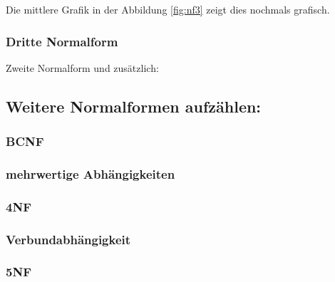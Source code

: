Die mittlere Grafik in der Abbildung \ref{fig:nf3} zeigt dies nochmals grafisch.

\subsubsection{Dritte Normalform}
Zweite Normalform und zusätzlich:
\begin{center}
\end{center}

\subsection{Weitere Normalformen aufzählen:}

\subsubsection{BCNF}


\subsubsection{mehrwertige Abhängigkeiten}

\subsubsection{4NF}

\subsubsection{Verbundabhängigkeit}

\subsubsection{5NF}